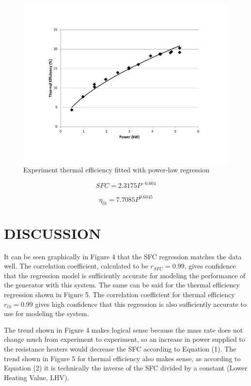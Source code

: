 \documentclass[12pt]{article}
\begin{document}
\begin{figure}[h!] %
   \centering
   \includegraphics[width=4.5in]{thermal_efficiency_plot.pdf} 
   \caption{Experiment thermal efficiency fitted with power-law regression}
   \label{fig:example}
\end{figure}


\begin{equation}
SFC = 2.3175P^{-0.604}
\end{equation}

\begin{equation}
\eta_{th} = 7.7085P^{0.6045}
\end{equation}


\newpage

\section*{\fontsize{12}{12}\selectfont DISCUSSION}
It can be seen graphically in Figure 4 that the SFC regression matches the data well. The correlation coefficient, calculated to be $r_{SFC} = 0.99$, gives confidence that the regression model is sufficiently accurate for modeling the performance of the generator with this system. The same can be said for the thermal efficiency regression shown in Figure 5. The correlation coefficient for thermal efficiency $r_{th} = 0.99$ gives high confidence that this regression is also sufficiently accurate to use for modeling the system.\bigskip

The trend shown in Figure 4 makes logical sense because the mass rate does not change much from experiment to experiment, so an increase in power supplied to the resistance heaters would decrease the SFC according to Equation (1). The trend shown in Figure 5 for thermal efficiency also makes sense, as according to Equation (2) it is technically the inverse of the SFC divided by a constant (Lower Heating Value, LHV).
\end{document}

